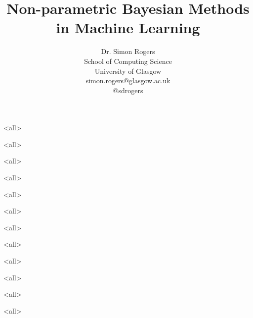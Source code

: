 \documentclass{beamer}
\title{Non-parametric Bayesian Methods in Machine Learning}
\author{Dr. Simon Rogers\\School of Computing Science\\University of Glasgow\\simon.rogers@glasgow.ac.uk\\@sdrogers}
\begin{document}
\mode<all>

\begin{frame}
	\titlepage
\end{frame}

\mode<all>



\mode<all>



\mode<all>



\mode<all>


\mode<all>


\mode<all>


\mode<all>


\mode<all>


\mode<all>


\mode<all>


\mode<all>

\end{document}
